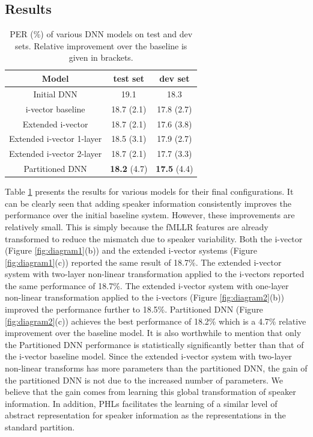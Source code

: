 \documentclass[a4paper]{article}
\begin{document}
 
 \subsection{Results}
 
 \begin{table}[t]
 	\renewcommand{\arraystretch}{1.3}
 	\caption{PER (\%) of various DNN models on test and dev sets. Relative improvement over the baseline is given in brackets. }
 	\label{tbl:results}
 	\centering
 	\begin{tabular}{|c|c|c|}	
 		\hline
 		Model & test set & dev set  \\
 		\hline
 		\hline
 		Initial DNN & 19.1  & 18.3 \\
 		\hline
 		i-vector baseline & 18.7 (2.1) & 17.8 (2.7) \\
 		\hline
 		Extended i-vector  & 18.7 (2.1)  & 17.6 (3.8)\\
 		\hline
 		Extended i-vector 1-layer & 18.5 (3.1)  & 17.9 (2.7)\\
 		\hline
 		Extended i-vector 2-layer & 18.7 (2.1) & 17.7 (3.3) \\
 		\hline
 		Partitioned DNN & \textbf{18.2} (4.7) & \textbf{17.5} (4.4)\\
 		\hline
 	\end{tabular}		
 \end{table}
 
 
 Table \ref{tbl:results} presents the results for various models for their final configurations. It can be clearly seen that adding speaker information consistently improves the performance over the initial baseline system.  However, these improvements are relatively small. This is simply because the fMLLR features are already transformed to reduce the mismatch due to speaker variability. Both the i-vector (Figure \ref{fig:diagram1}(b)) and the extended i-vector systems (Figure \ref{fig:diagram1}(c))  reported the same result of 18.7\%. The extended i-vector system with two-layer non-linear transformation applied to the i-vectors reported the same performance of 18.7\%.  The extended i-vector system with one-layer non-linear transformation applied to the i-vectors (Figure \ref{fig:diagram2}(b)) improved the performance further to 18.5\%. Partitioned DNN (Figure  \ref{fig:diagram2}(c))  achieves the best performance of 18.2\% which is a 4.7\% relative improvement over the baseline model. It is also worthwhile to mention that only the Partitioned DNN performance is statistically significantly better  than that of the i-vector baseline model.  Since the extended i-vector system with two-layer non-linear transforms has more parameters than the partitioned DNN, the gain of the partitioned DNN is not due to the increased number of parameters. We believe that the gain comes from learning this global transformation of  speaker information. In addition, PHLs facilitates the learning of a similar level of abstract representation for speaker information as the representations in the standard partition. 
 
\end{document}
